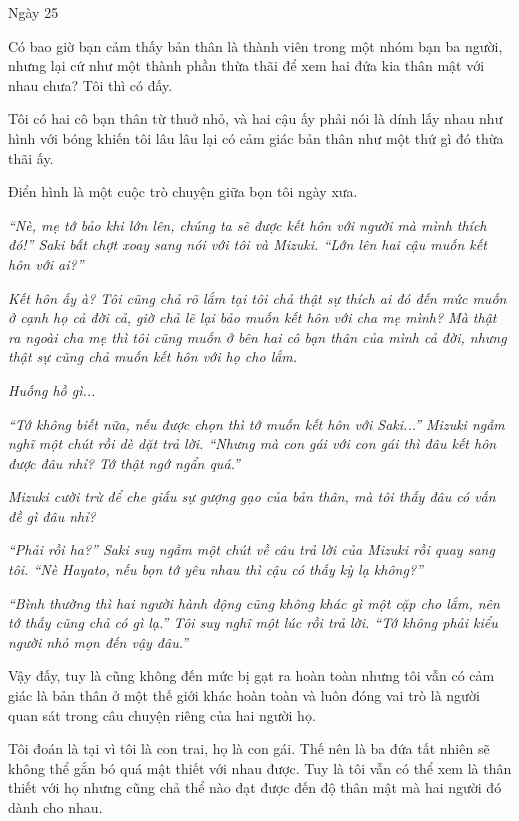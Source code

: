 {Ngày 25}
{ 
Có bao giờ bạn cảm thấy bản thân là thành viên trong một nhóm bạn ba
người, nhưng lại cứ như một thành phần thừa thãi để xem hai đứa kia thân
mật với nhau chưa? Tôi thì có đấy.

Tôi có hai cô bạn thân từ thuở nhỏ, và hai cậu ấy phải nói là dính lấy
nhau như hình với bóng khiến tôi lâu lâu lại có cảm giác bản thân như
một thứ gì đó thừa thãi ấy.

Điển hình là một cuộc trò chuyện giữa bọn tôi ngày xưa.

\emph{``Nè, mẹ tớ bảo khi lớn lên, chúng ta sẽ được kết hôn với người mà
    mình thích đó!'' Saki bất chợt xoay sang nói với tôi và Mizuki. ``Lớn
    lên hai cậu muốn kết hôn với ai?''}

\emph{Kết hôn ấy à? Tôi cũng chả rõ lắm tại tôi chả thật sự thích ai đó
    đến mức muốn ở cạnh họ cả đời cả, giờ chả lẽ lại bảo muốn kết hôn với
    cha mẹ mình? Mà thật ra ngoài cha mẹ thì tôi cũng muốn ở bên hai cô bạn
    thân của mình cả đời, nhưng thật sự cũng chả muốn kết hôn với họ cho
    lắm.}

\emph{Huống hồ gì...}

\emph{``Tớ không biết nữa, nếu được chọn thì tớ muốn kết hôn với
    Saki...'' Mizuki ngẫm nghĩ một chút rồi dè dặt trả lời. ``Nhưng mà con
    gái với con gái thì đâu kết hôn được đâu nhỉ? Tớ thật ngớ ngẩn quá.''}

\emph{Mizuki cười trừ để che giấu sự gượng gạo của bản thân, mà tôi thấy
    đâu có vấn đề gì đâu nhỉ?}

\emph{``Phải rồi ha?'' Saki suy ngẫm một chút về câu trả lời của Mizuki
    rồi quay sang tôi. ``Nè Hayato, nếu bọn tớ yêu nhau thì cậu có thấy kỳ
    lạ không?''}

\emph{``Bình thường thì hai người hành động cũng không khác gì một cặp
    cho lắm, nên tớ thấy cũng chả có gì lạ.'' Tôi suy nghĩ một lúc rồi trả
    lời. ``Tớ không phải kiểu người nhỏ mọn đến vậy đâu.''}

Vậy đấy, tuy là cũng không đến mức bị gạt ra hoàn toàn nhưng tôi vẫn có
cảm giác là bản thân ở một thế giới khác hoàn toàn và luôn đóng vai trò
là người quan sát trong câu chuyện riêng của hai người họ.

Tôi đoán là tại vì tôi là con trai, họ là con gái. Thế nên là ba đứa tất
nhiên sẽ không thể gắn bó quá mật thiết với nhau được. Tuy là tôi vẫn có
thể xem là thân thiết với họ nhưng cũng chả thể nào đạt được đến độ thân
mật mà hai người đó dành cho nhau.

}
